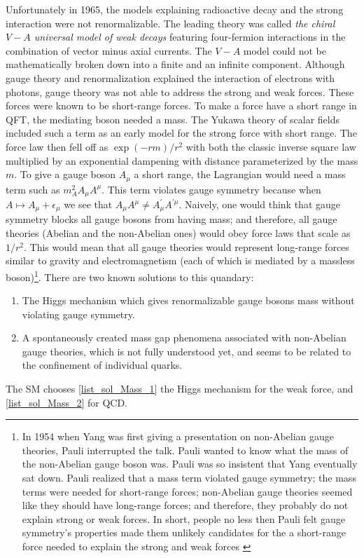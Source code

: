 Unfortunately in 1965, the models explaining radioactive decay and the strong interaction were not renormalizable. The leading theory was called \textit{the chiral $V-A$ universal model of weak decays} featuring four-fermion interactions in the combination of vector minus axial currents. The $V-A$ model could not be mathematically broken down into a finite and an infinite component. Although gauge theory and renormalization explained the interaction of electrons with photons, gauge theory was not able to address the strong and weak forces. These forces were known to be short-range forces. To make a force have a short range in QFT, the mediating boson needed a mass. The Yukawa theory of scalar fields included such a term as an early model for the strong force with short range. The force law then fell off as $\exp (-r m) / r^{2}$ with both the classic inverse square law multiplied by an exponential dampening with distance parameterized by the mass $m$. To give a gauge boson $A_{\mu}$ a short range, the Lagrangian would need a mass term such as $m_{A}^{2} A_{\mu} A^{\mu}$. This term violates gauge symmetry because when $A\mapsto A_{\mu}+\epsilon_\mu$ we see that $A_{\mu} A^{\mu} \neq A_{\mu}^{\prime} A^{\prime \mu}$. Naively, one would think that gauge symmetry blocks all gauge bosons from having mass; and therefore, all gauge theories (Abelian and the non-Abelian ones) would obey force laws that scale as $1 / r^{2}$. This would mean that all gauge theories would represent long-range forces similar to gravity and electromagnetism (each of which is mediated by a massless boson)\footnote{In 1954 when Yang was first giving a presentation on non-Abelian gauge theories, Pauli interrupted the talk. Pauli wanted to know what the mass of the non-Abelian gauge boson was. Pauli was so insistent that Yang eventually sat down. Pauli realized that a mass term violated gauge symmetry; the mass terms were needed for short-range forces; non-Abelian gauge theories seemed like they should have long-range forces; and therefore, they probably do not explain strong or weak forces. In short, people no less then Pauli felt gauge symmetry's properties made them unlikely candidates for the a short-range force needed to explain the strong and weak forces \cite{robinson2011symmetry}}. There are two known solutions to this quandary: 
\begin{enumerate}
	\item \label{list_sol_Mass_1}The Higgs mechanism which gives renormalizable gauge bosons mass without violating gauge symmetry.
	\item \label{list_sol_Mass_2}A spontaneously created mass gap phenomena associated with non-Abelian gauge theories, which is not fully understood yet, and seems to be related to the confinement of individual quarks.
\end{enumerate}
The SM chooses \eqref{list_sol_Mass_1} the Higgs mechanism for the weak force, and \eqref{list_sol_Mass_2} for QCD.

